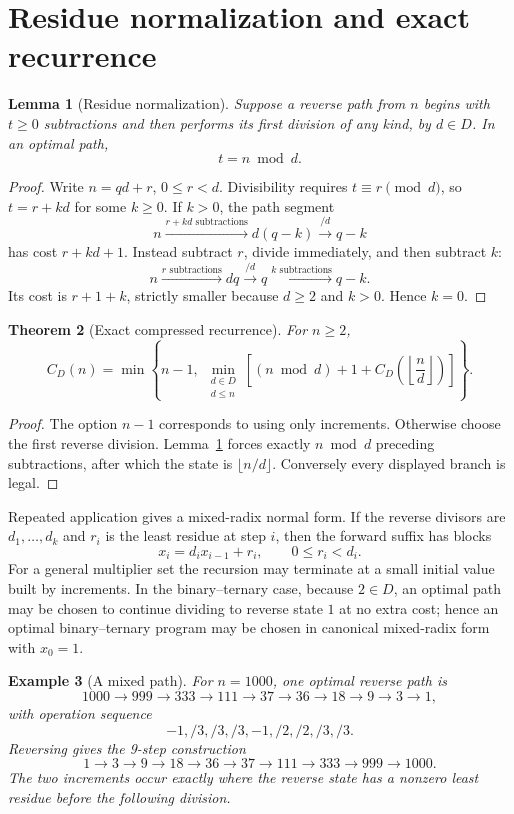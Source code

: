 \documentclass[11pt]{article}
\newtheorem{theorem}{Theorem}[section]
\newtheorem{lemma}[theorem]{Lemma}
\newtheorem{example}[theorem]{Example}
\begin{document}
\section{Residue normalization and exact recurrence}
\begin{lemma}[Residue normalization]\label{lem:normalization}
Suppose a reverse path from $n$ begins with $t\ge0$ subtractions and then performs its \emph{first division of any kind}, by $d\in D$. In an optimal path,
\[
 t=n\bmod d.
\]
\end{lemma}
\begin{proof}
Write $n=qd+r$, $0\le r<d$. Divisibility requires $t\equiv r\pmod d$, so $t=r+kd$ for some $k\ge0$. If $k>0$, the path segment
\[
 n\xrightarrow{r+kd\text{ subtractions}}d(q-k)\xrightarrow{/d}q-k
\]
has cost $r+kd+1$. Instead subtract $r$, divide immediately, and then subtract $k$:
\[
 n\xrightarrow{r\text{ subtractions}}dq\xrightarrow{/d}q\xrightarrow{k\text{ subtractions}}q-k.
\]
Its cost is $r+1+k$, strictly smaller because $d\ge2$ and $k>0$. Hence $k=0$.
\end{proof}

\begin{theorem}[Exact compressed recurrence]\label{thm:recurrence}
For $n\ge2$,
\[
 \boxed{
 C_D(n)=\min\left\{n-1,\ \min_{\substack{d\in D\\d\le n}}
 \left[(n\bmod d)+1+C_D\!\left(\left\lfloor\frac nd\right\rfloor\right)\right]\right\}.}
\]
\end{theorem}
\begin{proof}
The option $n-1$ corresponds to using only increments. Otherwise choose the first reverse division. Lemma~\ref{lem:normalization} forces exactly $n\bmod d$ preceding subtractions, after which the state is $\lfloor n/d\rfloor$. Conversely every displayed branch is legal.
\end{proof}

Repeated application gives a mixed-radix normal form. If the reverse divisors are $d_1,\dots,d_k$ and $r_i$ is the least residue at step $i$, then the forward suffix has blocks
\[
 x_i=d_i x_{i-1}+r_i,\qquad 0\le r_i<d_i.
\]
For a general multiplier set the recursion may terminate at a small initial value built by increments. In the binary--ternary case, because $2\in D$, an optimal path may be chosen to continue dividing to reverse state $1$ at no extra cost; hence an optimal binary--ternary program may be chosen in canonical mixed-radix form with $x_0=1$.

\begin{example}[A mixed path]
For $n=1000$, one optimal reverse path is
\[
1000\to999\to333\to111\to37\to36\to18\to9\to3\to1,
\]
with operation sequence
\[
-1,/3,/3,/3,-1,/2,/2,/3,/3.
\]
Reversing gives the 9-step construction
\[
1\to3\to9\to18\to36\to37\to111\to333\to999\to1000.
\]
The two increments occur exactly where the reverse state has a nonzero least residue before the following division.
\end{example}
\end{document}
